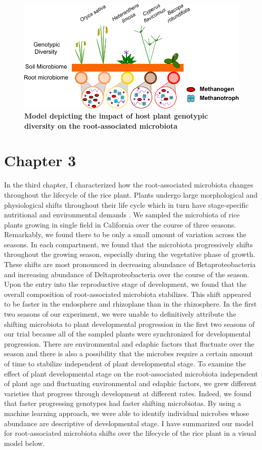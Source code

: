 \begin{figure}[h]
\centering
\includegraphics[width=6in]{Figures/figurec_2}
\caption[Figure 5.2]{\textbf{Model depicting the impact of host plant genotypic diversity on the root-associated microbiota}}
\label{Figure 5.2}
\end{figure}

\section{Chapter 3}
In the third chapter, I characterized how the root-associated microbiota changes throughout the lifecycle of the rice plant. Plants undergo large morphological and physiological shifts throughout their life cycle which in turn have stage-specific nutritional and environmental demands \cite{Ishimaru2013}. We sampled the microbiota of rice plants growing in single field in California over the course of three seasons. Remarkably, we found there to be only a small amount of variation across the seasons. In each compartment, we found that the microbiota progressively shifts throughout the growing season, especially during the vegetative phase of growth. These shifts are most pronounced in decreasing abundance of Betaproteobacteria and increasing abundance of Deltaproteobacteria over the course of the season. Upon the entry into the reproductive stage of development, we found that the overall composition of root-associated microbiota stabilizes. This shift appeared to be faster in the endosphere and rhizoplane than in the rhizosphere. In the first two seasons of our experiment, we were unable to definitively attribute the shifting microbiota to plant developmental progression in the first two seasons of our trial because all of the sampled plants were synchronized for developmental progression. There are environmental and edaphic factors that fluctuate over the season and there is also a possibility that the microbes require a certain amount of time to stabilize independent of plant developmental stage. To examine the effect of plant developmental stage on the root-associated microbiota independent of plant age and fluctuating environmental and edaphic factors, we grew different varieties that progress through development at different rates. Indeed, we found that faster progressing genotypes had faster shifting microbiotas. By using a machine learning approach, we were able to identify individual microbes whose abundance are descriptive of developmental stage. I have summarized our model for root-associated microbiota shifts over the lifecycle of the rice plant in a visual model below.

